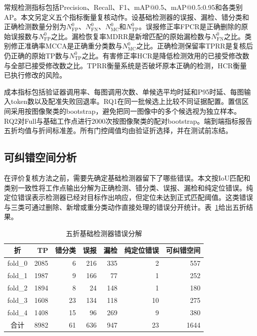 常规检测指标包括Precision、Recall、F1、mAP@0.5、mAP@0.5:0.95和各类别AP。本文另定义五个指标衡量复核动作。设基础检测器的误报、漏检、错分类和正确检测数量分别为$N_{\mathrm{FP}}^0$、$N_{\mathrm{FN}}^0$、$N_{\mathrm{MC}}^0$和$N_{\mathrm{TP}}^0$。误报修正率FPCR是正确删除的原始误报数与$N_{\mathrm{FP}}^0$之比。漏检恢复率MDRR是新增匹配的原始漏检数与$N_{\mathrm{FN}}^0$之比。类别修正准确率MCCA是正确重分类数与$N_{\mathrm{MC}}^0$之比。正确检测保留率TPRR是复核后仍正确的原始TP数与$N_{\mathrm{TP}}^0$之比。有害修正率HCR是降低检测效用的已接受修改数与全部已接受修改数之比。TPRR衡量系统是否破坏原本正确的检测，HCR衡量已执行修改的风险。

成本指标包括验证器调用率、每图调用次数、单候选平均时延和P95时延、每图输入token数以及配准失败回退率。RQ1在同一批候选上比较不同证据配置。置信区间采用按图像聚类的bootstrap，避免把同一图像中的多个候选视为独立样本。RQ2对Full与基础工作点进行2000次按图像聚类的配对bootstrap。端到端指标报告五折均值与折间标准差。所有门控阈值均由验证折选择，并在测试前冻结。

\subsection{可纠错空间分析}
\label{subsec:correctable_space}

在评价复核方法之前，需要先确定基础检测器留下了哪些错误。本文按IoU匹配和类别一致性将工作点输出分解为正确检测、错分类、误报、漏检和纯定位错误。纯定位错误表示检测器已经对目标作出响应，但定位未达到正式匹配阈值。这类错误与三类可通过删除、新增或重分类动作直接处理的错误分开统计。表~\ref{tab:error_decomposition}给出五折结果。

\begin{table}[t]
  \centering
  \caption{五折基础检测器错误分解}
  \label{tab:error_decomposition}
  \setlength{\tabcolsep}{7pt}
  \begin{tabular}{crrrrrr}
    \hline
    折 & TP & 错分类 & 误报 & 漏检 & 纯定位错误 & 可纠错空间 \\
    \hline
    fold\_0 & 2085 & 6  & 216 & 335 & 2  & 557 \\
    fold\_1 & 1987 & 9  & 166 & 77  & 1  & 252 \\
    fold\_2 & 1894 & 8  & 24  & 148 & 1  & 180 \\
    fold\_3 & 1608 & 23 & 134 & 118 & 10 & 275 \\
    fold\_4 & 1408 & 15 & 96  & 269 & 9  & 380 \\
    \hline
    合计 & 8982 & 61 & 636 & 947 & 23 & 1644 \\
    \hline
  \end{tabular}
\end{table}

